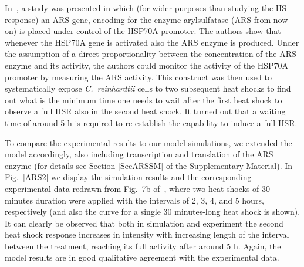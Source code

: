 \documentclass[oneside, 10pt, a4paper, twocolumn]{article}
\begin{document}


In~\cite{Schroda2000}, a study was presented in which (for wider purposes than studying the HS response) 
an ARS gene, encoding for the enzyme arylsulfatase (ARS from now on) 
is placed under control
of the HSP70A promoter. The authors show that whenever the HSP70A gene is activated also the ARS enzyme is produced.
Under the assumption of a direct proportionality between the concentration of the ARS enzyme and its activity, 
the authors could monitor the activity of the HSP70A promoter by measuring the ARS activity.
This construct was then used to systematically expose \textit{C.~reinhardtii} cells to two
subsequent heat shocks to find out what is the minimum time
one needs to wait after the first heat shock to observe a full HSR also in the second heat shock.
It turned out that a waiting time of around 5 h is required to re-establish the capability to
induce a full HSR.

To compare the experimental results to our model simulations, we extended the model
accordingly, also including transcription and translation of the ARS enzyme (for details see Section \ref{SecARSSM} of the Supplementary Material). 
In Fig.~\ref{ARS2} we display the simulation results and the corresponding experimental data redrawn from Fig.~7b of~\cite{Schroda2000}, where two heat shocks of 30 minutes duration were 
applied with the intervals of 2, 3, 4, and 5 hours, respectively (and also the curve for a single 30 minutes-long heat shock is shown). 
It can clearly be observed that both in simulation and experiment the second heat shock response
increases in intensity with increasing length of the interval between the treatment, reaching
its full activity after around 5 h. Again, the model results are in good qualitative 
agreement with the experimental data.
\end{document}
